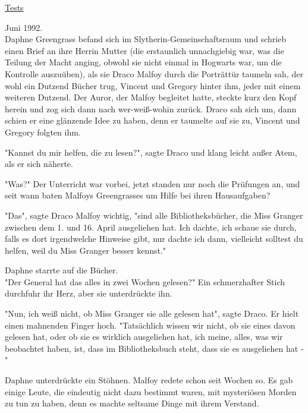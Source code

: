 

\hypertarget{tests}{%

\uline{Tests}

Juni 1992.\\ Daphne Greengrass befand sich im Slytherin-Gemeinschaftsraum und schrieb einen Brief an ihre Herrin Mutter (die erstaunlich unnachgiebig war, was die Teilung der Macht anging, obwohl sie nicht einmal in Hogwarts war, um die Kontrolle auszuüben), als sie Draco Malfoy durch die Porträttür taumeln sah, der wohl ein Dutzend Bücher trug, Vincent und Gregory hinter ihm, jeder mit einem weiteren Dutzend. Der Auror, der Malfoy begleitet hatte, steckte kurz den Kopf herein und zog sich dann nach wer-weiß-wohin zurück. Draco sah sich um, dann schien er eine glänzende Idee zu haben, denn er taumelte auf sie zu, Vincent und Gregory folgten ihm.

"Kannst du mir helfen, die zu lesen?", sagte Draco und klang leicht außer Atem, als er sich näherte.

"Was?" Der Unterricht war vorbei, jetzt standen nur noch die Prüfungen an, und seit wann baten Malfoys Greengrasses um Hilfe bei ihren Hausaufgaben?

"Das", sagte Draco Malfoy wichtig, "sind alle Bibliotheksbücher, die Miss Granger zwischen dem 1. und 16. April ausgeliehen hat. Ich dachte, ich schaue sie durch, falls es dort irgendwelche Hinweise gibt, nur dachte ich dann, vielleicht solltest du helfen, weil du Miss Granger besser kennst."

Daphne starrte auf die Bücher.\\ "Der General hat das alles in zwei Wochen gelesen?" Ein schmerzhafter Stich durchfuhr ihr Herz, aber sie unterdrückte ihn.

"Nun, ich weiß nicht, ob Miss Granger sie alle gelesen hat", sagte Draco. Er hielt einen mahnenden Finger hoch. "Tatsächlich wissen wir nicht, ob sie eines davon gelesen hat, oder ob sie es wirklich ausgeliehen hat, ich meine, alles, was wir beobachtet haben, ist, dass im Bibliotheksbuch steht, dass sie es ausgeliehen hat -"

Daphne unterdrückte ein Stöhnen. Malfoy redete schon seit Wochen so. Es gab einige Leute, die eindeutig nicht dazu bestimmt waren, mit mysteriösen Morden zu tun zu haben, denn es machte seltsame Dinge mit ihrem Verstand.

}

